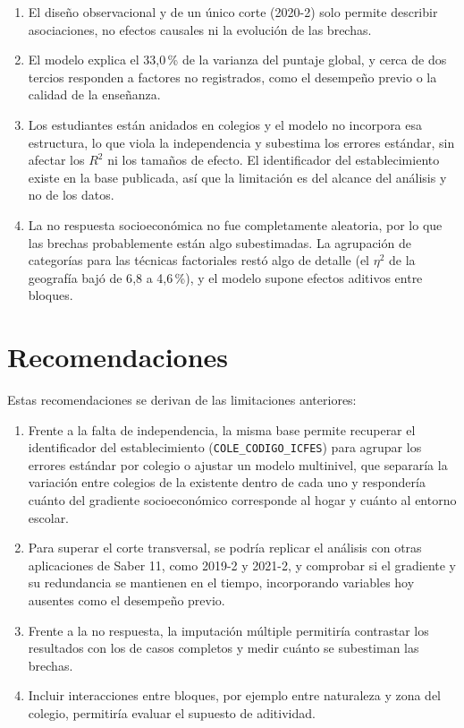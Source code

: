 \documentclass[12pt]{article}
\begin{document}
\begin{enumerate}[leftmargin=*,itemsep=2pt,topsep=2pt]
  \item El diseño observacional y de un único corte (2020-2) solo permite describir asociaciones, no efectos causales ni la evolución de las brechas.

  \item El modelo explica el 33{,}0\,\% de la varianza del puntaje global, y cerca de dos tercios responden a factores no registrados, como el desempeño previo o la calidad de la enseñanza.

  \item Los estudiantes están anidados en colegios y el modelo no incorpora esa estructura, lo que viola la independencia y subestima los errores estándar, sin afectar los $R^2$ ni los tamaños de efecto. El identificador del establecimiento existe en la base publicada, así que la limitación es del alcance del análisis y no de los datos.

  \item La no respuesta socioeconómica no fue completamente aleatoria, por lo que las brechas probablemente están algo subestimadas. La agrupación de categorías para las técnicas factoriales restó algo de detalle (el $\eta^2$ de la geografía bajó de 6{,}8 a 4{,}6\,\%), y el modelo supone efectos aditivos entre bloques.
\end{enumerate}

\vspace{0.1cm}

\section{Recomendaciones}
\label{sec:recomendaciones}

Estas recomendaciones se derivan de las limitaciones anteriores:

\begin{enumerate}[leftmargin=*,itemsep=2pt,topsep=2pt]
  \item Frente a la falta de independencia, la misma base permite recuperar el identificador del establecimiento (\texttt{COLE\_CODIGO\_ICFES}) para agrupar los errores estándar por colegio o ajustar un modelo multinivel, que separaría la variación entre colegios de la existente dentro de cada uno y respondería cuánto del gradiente socioeconómico corresponde al hogar y cuánto al entorno escolar.
  
  \item Para superar el corte transversal, se podría replicar el análisis con otras aplicaciones de Saber 11, como 2019-2 y 2021-2, y comprobar si el gradiente y su redundancia se mantienen en el tiempo, incorporando variables hoy ausentes como el desempeño previo.
  
  \item Frente a la no respuesta, la imputación múltiple permitiría contrastar los resultados con los de casos completos y medir cuánto se subestiman las brechas.
  
  \item Incluir interacciones entre bloques, por ejemplo entre naturaleza y zona del colegio, permitiría evaluar el supuesto de aditividad.
\end{enumerate}
\end{document}
